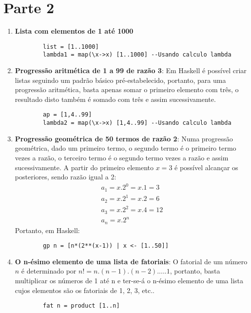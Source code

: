 \documentclass{article}
\begin{document}
\section*{Parte 2}
    \begin{enumerate}
        \item \textbf{Lista com elementos de 1 até 1000}
        \begin{lstlisting}
        list = [1..1000]
        lambda1 = map(\x->x) [1..1000] --Usando calculo lambda
        \end{lstlisting}
        
        \item \textbf{Progressão aritmética de 1 a 99 de razão 3}: Em Haskell é
            possível criar listas seguindo um padrão básico pré-estabelecido,
            portanto, para uma progressão aritmética, basta apenas somar o
            primeiro elemento com três, o resultado disto também é somado com
            três e assim sucessivamente. 
        \begin{lstlisting}
        ap = [1,4..99]
        lambda2 = map(\x->x) [1,4..99] --Usando calculo lambda
        \end{lstlisting}
        
        \item \textbf{Progressão geométrica de 50 termos de razão 2}: Numa
            progressão geométrica, dado um primeiro termo, o segundo termo é o
            primeiro termo vezes a razão, o terceiro termo é o segundo termo
            vezes a razão e assim sucessivamente. A partir do primeiro elemento
            $x = 3$ é possível alcançar os posteriores, sendo razão igual a 2:
        \begin{gather*}
            a_{1} = x.2^{0} = x.1  = 3\\
            a_{2} = x.2^{1} = x.2  = 6\\
            a_{3} = x.2^{2} = x.4  = 12\\
            a_{n} = x.2^{n}
        \end{gather*}
        Portanto, em Haskell:
        \begin{lstlisting}
        gp n = [n*(2**(x-1)) | x <- [1..50]]
        \end{lstlisting}
        
        \item \textbf{O n-ésimo elemento de uma lista de fatoriais}: O fatorial
            de um número $n$ é determinado por $n! = n.(n-1).(n-2) . ... .1$,
            portanto, basta multiplicar os números de 1 até n e ter-se-á o
            n-ésimo elemento de uma lista cujos elementos são os fatoriais de
            1, 2, 3, etc..
        \begin{lstlisting}
        fat n = product [1..n]
        \end{lstlisting}
    \end{enumerate}
\end{document}
